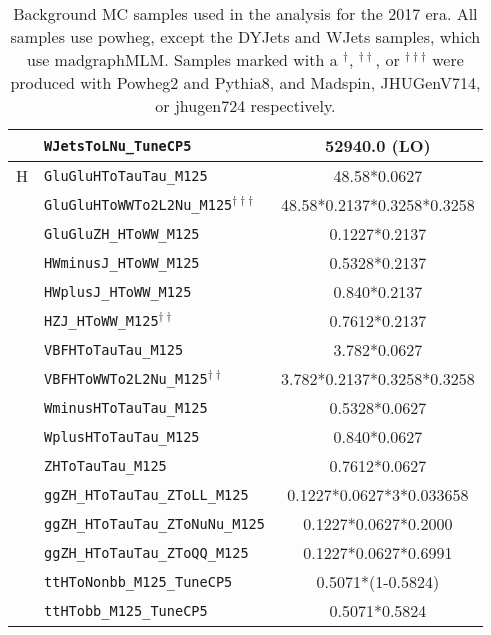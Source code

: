 \begin{table}[ht]
\begin{center}
{\begin{tabular}{|c|l|c|}
    & \texttt{WJetsToLNu\_TuneCP5} & 52940.0 (LO)\\
    \hline
    H & \texttt{GluGluHToTauTau\_M125} & 48.58*0.0627\\
    & \texttt{GluGluHToWWTo2L2Nu\_M125}$^{\dagger\dagger\dagger}$ & 48.58*0.2137*0.3258*0.3258\\
    & \texttt{GluGluZH\_HToWW\_M125} & 0.1227*0.2137\\
    & \texttt{HWminusJ\_HToWW\_M125} & 0.5328*0.2137\\
    & \texttt{HWplusJ\_HToWW\_M125} & 0.840*0.2137\\
    & \texttt{HZJ\_HToWW\_M125}$^{\dagger\dagger}$ & 0.7612*0.2137\\
    & \texttt{VBFHToTauTau\_M125} & 3.782*0.0627\\
    & \texttt{VBFHToWWTo2L2Nu\_M125}$^{\dagger\dagger}$ & 3.782*0.2137*0.3258*0.3258\\
    & \texttt{WminusHToTauTau\_M125} & 0.5328*0.0627\\
    & \texttt{WplusHToTauTau\_M125} & 0.840*0.0627\\
    & \texttt{ZHToTauTau\_M125} & 0.7612*0.0627\\
    & \texttt{ggZH\_HToTauTau\_ZToLL\_M125} & 0.1227*0.0627*3*0.033658\\
    & \texttt{ggZH\_HToTauTau\_ZToNuNu\_M125} & 0.1227*0.0627*0.2000\\
    & \texttt{ggZH\_HToTauTau\_ZToQQ\_M125} & 0.1227*0.0627*0.6991\\
    & \texttt{ttHToNonbb\_M125\_TuneCP5} & 0.5071*(1-0.5824)\\
    & \texttt{ttHTobb\_M125\_TuneCP5} & 0.5071*0.5824\\
    \hline
    \end{tabular}
    }
    \end{center}
    \caption{Background MC samples used in the analysis for the 2017 era. All samples use powheg, except the DYJets and WJets samples, which use madgraphMLM. Samples marked with a $^\dagger$, $^{\dagger\dagger}$, or $^{\dagger\dagger\dagger}$ were produced with Powheg2 and Pythia8, and Madspin, JHUGenV714, or jhugen724 respectively.}
    \label{tab:2017mcbkg}
    \end{table}
    
